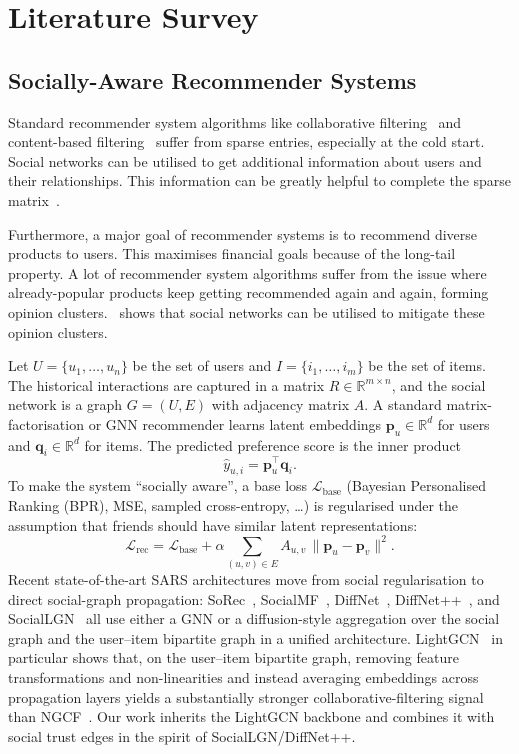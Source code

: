 \documentclass[conference]{IEEEtran}
\begin{document}
\section{Literature Survey}

\subsection{Socially-Aware Recommender Systems}
Standard recommender system algorithms like collaborative
filtering~\cite{schafer2007collaborative} and content-based
filtering~\cite{phalle2024content} suffer from sparse entries,
especially at the cold start. Social networks can be utilised to get
additional information about users and their relationships. This
information can be greatly helpful to complete the sparse
matrix~\cite{SocialRecsys}.

Furthermore, a major goal of recommender systems is to recommend diverse
products to users. This maximises financial goals because of the
long-tail property. A lot of recommender system algorithms suffer from
the issue where already-popular products keep getting recommended again
and again, forming opinion clusters.~\cite{SocialRecsysopinion} shows
that social networks can be utilised to mitigate these opinion clusters.

Let $U=\{u_1,\dots,u_n\}$ be the set of users and $I=\{i_1,\dots,i_m\}$
be the set of items. The historical interactions are captured in a
matrix $R\in\mathbb{R}^{m\times n}$, and the social network is a graph
$G=(U,E)$ with adjacency matrix $A$. A standard matrix-factorisation or
GNN recommender learns latent embeddings $\mathbf{p}_u\in\mathbb{R}^d$
for users and $\mathbf{q}_i\in\mathbb{R}^d$ for items. The predicted
preference score is the inner product
\[
\hat{y}_{u,i}=\mathbf{p}_u^\top\mathbf{q}_i.
\]
To make the system ``socially aware'', a base loss
$\mathcal{L}_{\text{base}}$ (Bayesian Personalised Ranking (BPR), MSE,
sampled cross-entropy, \dots) is regularised under the assumption that
friends should have similar latent representations:
\[
\mathcal{L}_{\text{rec}}=\mathcal{L}_{\text{base}}+\alpha\!\!\!
\sum_{(u,v)\in E}\!\!\!A_{u,v}\,\lVert\mathbf{p}_u-\mathbf{p}_v\rVert^2.
\]
Recent state-of-the-art SARS architectures move from social
regularisation to direct social-graph propagation:
SoRec~\cite{ma2008sorec}, SocialMF~\cite{jamali2010socialmf},
DiffNet~\cite{wu2019diffnet}, DiffNet++~\cite{wu2020diffnet++}, and
SocialLGN~\cite{liao2022sociallgn} all use either a GNN or a
diffusion-style aggregation over the social graph and the user--item
bipartite graph in a unified architecture. LightGCN~\cite{he2020lightgcn}
in particular shows that, on the user--item bipartite graph, removing
feature transformations and non-linearities and instead averaging
embeddings across propagation layers yields a substantially stronger
collaborative-filtering signal than NGCF~\cite{wang2019ngcf}. Our work
inherits the LightGCN backbone and combines it with social trust edges
in the spirit of SocialLGN/DiffNet++.
\end{document}
